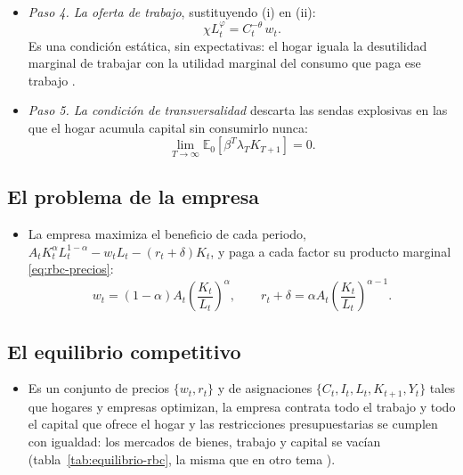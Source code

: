 \documentclass[11pt]{article}
\begin{document}
\begin{itemize}
\item \emph{Paso 4. La oferta de trabajo}, sustituyendo (i) en (ii):
  \begin{equation*}
  \chi L_t^{\varphi}=C_t^{-\theta}\,w_t .
  \end{equation*}
  Es una condición estática, sin expectativas: el hogar iguala la desutilidad marginal de trabajar con la utilidad marginal del consumo que paga ese trabajo .
\item \emph{Paso 5. La condición de transversalidad} descarta las sendas explosivas en las que el hogar acumula capital sin consumirlo nunca:
  \begin{equation*}
  \lim_{T\to\infty}\mathbb{E}_0\left[\beta^T\lambda_TK_{T+1}\right]=0.
  \end{equation*}
\end{itemize}

\subsection{El problema de la empresa}

\begin{itemize}
\item La empresa maximiza el beneficio de cada periodo, $A_tK_t^{\alpha}L_t^{1-\alpha}-w_tL_t-(r_t+\delta)K_t$, y paga a cada factor su producto marginal \eqref{eq:rbc-precios}:
  \begin{equation*}
  w_t=(1-\alpha)A_t\left(\frac{K_t}{L_t}\right)^{\alpha},\qquad r_t+\delta=\alpha A_t\left(\frac{K_t}{L_t}\right)^{\alpha-1}.
  \end{equation*}
\end{itemize}

\subsection{El equilibrio competitivo}

\begin{itemize}
\item Es un conjunto de precios $\{w_t,r_t\}$ y de asignaciones $\{C_t,I_t,L_t,K_{t+1},Y_t\}$ tales que hogares y empresas optimizan, la empresa contrata todo el trabajo y todo el capital que ofrece el hogar y las restricciones presupuestarias se cumplen con igualdad: los mercados de bienes, trabajo y capital se vacían (tabla~\ref{tab:equilibrio-rbc}, la misma que en otro tema ).
\end{itemize}
\end{document}
